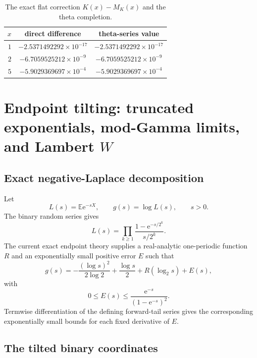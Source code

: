 \documentclass[11pt]{article}
\numberwithin{equation}{section}
\theoremstyle{definition}
\theoremstyle{remark}
\newcommand{\E}{\mathbb E}
\newcommand{\e}{\mathrm e}
\begin{document}
\begin{table}[ht]
\centering
\caption{The exact flat correction $K(x)-M_K(x)$ and the theta completion.}
\label{p5:tab:theta-check}
\begin{tabular}{@{}rcc@{}}
\toprule
$x$ & direct difference & theta-series value\\
\midrule
$1$ & $-2.5371492292\times10^{-17}$ & $-2.5371492292\times10^{-17}$\\
$2$ & $-6.7059525212\times10^{-9}$  & $-6.7059525212\times10^{-9}$\\
$5$ & $-5.9029369697\times10^{-4}$  & $-5.9029369697\times10^{-4}$\\
\bottomrule
\end{tabular}
\end{table}

\section{Endpoint tilting: truncated exponentials, mod-Gamma limits, and Lambert $W$}

\subsection{Exact negative-Laplace decomposition}

Let
\begin{equation}\label{p5:eq:L-g-def}
 L(s)=\E\e^{-sX},\qquad g(s)=\log L(s),\qquad s>0.
\end{equation}
The binary random series gives
\begin{equation}\label{p5:eq:L-product}
 L(s)=\prod_{k\ge1}\frac{1-\e^{-s/2^k}}{s/2^k}.
\end{equation}
The current exact endpoint theory supplies a real-analytic one-periodic
function $R$ and an exponentially small positive error $E$ such that
\begin{equation}\label{p5:eq:g-decomp}
 \boxed{
 g(s)=-\frac{(\log s)^2}{2\log2}+\frac{\log s}{2}
 +R(\log_2s)+E(s),}
\end{equation}
with
\begin{equation}\label{p5:eq:E-bound}
 0\le E(s)\le\frac{\e^{-s}}{(1-\e^{-s})^2}.
\end{equation}
Termwise differentiation of the defining forward-tail series gives the
corresponding exponentially small bounds for each fixed derivative of $E$.

\subsection{The tilted binary coordinates}
\end{document}

